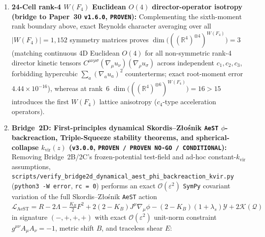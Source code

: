 \documentclass[11pt,a4paper]{article}
\begin{document}
\begin{enumerate}
    (iii)~halo virialization strongly regulates nonlinear scales (Bin~1 Halofit boost $+47\%$ at $\ell = 100$): imposing $k_{\mathrm{vir}} = 0.30$ or $0.15\;\mathrm{Mpc}^{-1}$ shrinks the global \texttt{DES} shift to $S_8^{\Lambda\mathrm{CDM}} = 0.8184\text{--}0.8203$, yet \textbf{\texttt{Euclid} Stage-IV} still separates the $c_S = 0$ tomographic tilt from flat $c_S = 1$ at optimal matched-filter SNR \textbf{$16.05\sigma / 5.34\sigma / 4.28\sigma$} (\texttt{allk}, full $\ell\in[30,1000]$ / quasi-linear $\ell\le 150$ / strictly linear $k \le 0.15\;\mathrm{Mpc}^{-1}$), \textbf{$5.79\sigma / 3.87\sigma / 3.62\sigma$} ($k_{\mathrm{vir}} = 0.30$), and \textbf{$3.93\sigma / 2.96\sigma / 2.89\sigma$} ($k_{\mathrm{vir}} = 0.15$, fixed-cosmology/zero-IA ceiling), whereas adversarial monotone $\bar{N}$ shifts $S_8$ \emph{upward} to $0.8341$ ($+3.45\sigma$ vs.\ \texttt{DES Y3} $\Lambda$CDM-opt).
    \item \textbf{24-Cell rank-4 $W(F_4)$ Euclidean $O(4)$ director-operator isotropy (bridge to Paper~30 \texttt{v1.6.0}, \texttt{PROVEN}):}
    Complementing the sixth-moment rank boundary above, exact Reynolds character averaging over all $|W(F_4)| = 1{,}152$ symmetry matrices proves $\dim\bigl(((\mathbb{R}^4)^{\otimes 4})^{W(F_4)}\bigr) = 3$ (matching continuous 4D Euclidean $O(4)$ for all non-symmetric rank-4 director kinetic tensors $C^{\mu\nu\rho\sigma}(\nabla_\mu u_\nu)(\nabla_\rho u_\sigma)$ across independent $c_1, c_2, c_3$, forbidding hypercubic $\sum_a(\nabla_a u_a)^2$ counterterms; exact root-moment error $4.44\times 10^{-16}$), whereas at rank~6 $\dim\bigl(((\mathbb{R}^4)^{\otimes 6})^{W(F_4)}\bigr) = 16 > 15$ introduces the first $W(F_4)$ lattice anisotropy ($c_4$-type acceleration operators).
    \item \textbf{Bridge~2D: First-principles dynamical Skordis--Z{\l}o\'snik \texttt{AeST} $\phi$-backreaction, Triple-Squeeze stability theorems, and spherical-collapse $k_{\mathrm{vir}}(z)$ (\texttt{v3.0.0}, \texttt{PROVEN / PROVEN NO-GO / CONDITIONAL}):}
    Removing Bridge~2B/2C's frozen-potential test-field and ad-hoc constant-$k_{\mathrm{vir}}$ assumptions, \texttt{scripts/\allowbreak verify\_\allowbreak bridge2d\_\allowbreak dynamical\_\allowbreak aest\_\allowbreak phi\_\allowbreak backreaction\_\allowbreak kvir.py} (\texttt{python3 -W error}, \texttt{rc = 0}) performs an exact $\mathcal{O}(\varepsilon^2)$ \texttt{SymPy} covariant variation of the full Skordis--Z{\l}o\'snik \texttt{AeST} action $\mathcal{L}_{\mathrm{AeST}} = R - 2\Lambda - \frac{K_B}{2}F^2 + 2(2-K_B)J^\mu\nabla_\mu\phi - (2-K_B)(1+\lambda_s)\mathcal{Y} + 2\mathcal{K}(\mathcal{Q})$ in signature $(-,+,+,+)$ with exact $\mathcal{O}(\varepsilon^2)$ unit-norm constraint $g^{\mu\nu}A_\mu A_\nu = -1$, metric shift $B$, and traceless shear $E$:

\end{enumerate}
\end{document}
